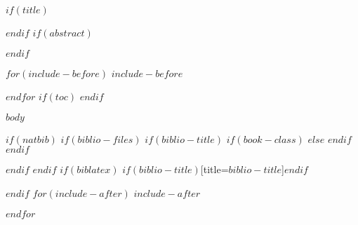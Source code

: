 \documentclass[ openright,titlepage,fleqn,numbers=noenddot,headinclude,
                10pt,a4paper,BCOR5mm,footinclude,cleardoublepage=empty,
                ]{scrreprt}
\author{%
   \authsf  $for(author)$$author$$sep$ \\ $endfor$ \\
    Klinisches Krebsregister \\
    \vspace{20pt} 
   \authsf  \@date 
    }
\begin{document}
$if(title)$
%

\cleardoublepage
$endif$
$if(abstract)$
\begin{abstract}
$abstract$
\end{abstract}
$endif$

$for(include-before)$
$include-before$

$endfor$
$if(toc)$
{
\hypersetup{linkcolor=black}
\setcounter{tocdepth}{$toc-depth$}
\tableofcontents
\cleardoublepage
}
$endif$

\pagestyle{scrheadings}
\clearscrheadfoot
\ohead{{\headmark}}
\cfoot{{\pagemark}}

$body$

$if(natbib)$
$if(biblio-files)$
$if(biblio-title)$
$if(book-class)$
\renewcommand\bibname{$biblio-title$}
$else$
\renewcommand\refname{$biblio-title$}
$endif$
$endif$


$endif$
$endif$
$if(biblatex)$
\printbibliography$if(biblio-title)$[title=$biblio-title$]$endif$

$endif$
$for(include-after)$
$include-after$

$endfor$
\end{document}
